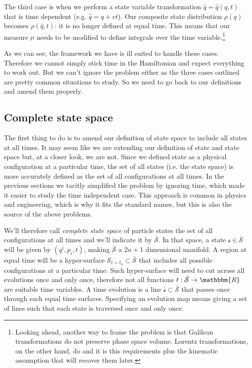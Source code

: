 \documentclass[aps,pra,10pt,twocolumn,floatfix,nofootinbib]{revtex4-1}
\numberwithin{equation}{section}
\theoremstyle{definition}
\begin{document}
The third case is when we perform a state variable transformation $\hat{q}=\hat{q}(q,t)$ that is time dependent (e.g. $\hat{q}=q+vt$). Our composite state distribution $\rho(q)$ becomes $\rho(\hat{q},t)$: it is no longer defined at equal time. This means that our measure $\mu$ needs to be modified to define integrals over the time variable.\footnote{Looking ahead, another way to frame the problem is that Galilean transformations do not preserve phase space volume. Lorentz transformations, on the other hand, do\cite{Treumann} and it is this requirements plus the kinematic assumption that will recover them later.}

As we can see, the framework we have is ill suited to handle these cases. Therefore we cannot simply stick time in the Hamiltonian and expect everything to work out. But we can't ignore the problem either as the three cases outlined are pretty common situations to study. So we need to go back to our definitions and amend them properly.

\subsection{Complete state space}

The first thing to do is to amend our definition of state space to include all states at all times. It may seem like we are extending our definition of state and state space but, at a closer look, we are not. Since we defined state as a physical configuration at a particular time, the set of all states (i.e. the state space) is more accurately defined as the set of all configurations at all times. In the previous sections we tacitly simplified the problem by ignoring time, which made it easier to study the time independent case. This approach is common in physics and engineering, which is why it fits the standard names, but this is also the source of the above problems.

We'll therefore call \emph{complete state space} of particle states the set of all configurations at all times and we'll indicate it by $\bar{\mathcal{S}}$. In that space, a state $\mathcal{s} \in \bar{\mathcal{S}}$ will be given by $(q^i, p_i, t)$, making $\bar{\mathcal{S}}$ a $2n+1$ dimensional manifold. A region at equal time will be a hyper-surface $\mathcal{S}_{t=t_0} \subset \bar{\mathcal{S}}$ that includes all possible configurations at a particular time. Such hyper-surface will need to cut across all evolutions once and only once, therefore not all functions $t : \bar{\mathcal{S}} \rightarrow \mathbbm{R}$ are suitable time variables. A time evolution is a line  $\bar{\mathcal{s}} \subset \bar{\mathcal{S}}$ that passes once through each equal time surfaces. Specifying an evolution map means giving a set of lines such that each state is traversed once and only once.
\end{document}

